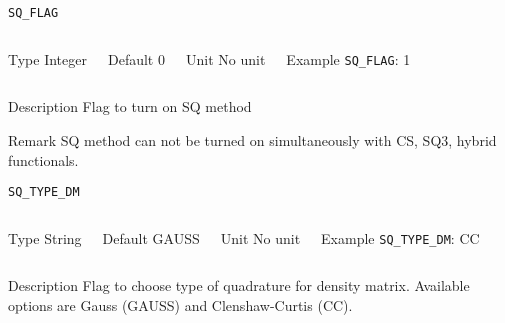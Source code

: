 \begin{frame}[allowframebreaks]{\texttt{SQ\_FLAG}} \label{SQ_FLAG}
\vspace*{-12pt}
\begin{columns}
\begin{block}{Type}
Integer
\end{block}

\begin{block}{Default}
0
\end{block}

\begin{block}{Unit}
No unit
\end{block}

\begin{block}{Example}
\texttt{SQ\_FLAG}: 1
\end{block}
\end{columns}

\begin{block}{Description}
Flag to turn on SQ method 
\end{block}

\begin{block}{Remark}
SQ method can not be turned on simultaneously with CS, SQ3, hybrid functionals. 
\end{block}

\end{frame}


\begin{frame}[allowframebreaks]{\texttt{SQ\_TYPE\_DM}} \label{SQ_TYPE_DM}
\vspace*{-12pt}
\begin{columns}
\begin{block}{Type}
String
\end{block}

\begin{block}{Default}
GAUSS
\end{block}

\begin{block}{Unit}
No unit
\end{block}

\begin{block}{Example}
\texttt{SQ\_TYPE\_DM}: CC
\end{block}
\end{columns}

\begin{block}{Description}
Flag to choose type of quadrature for density matrix. Available options are Gauss (GAUSS) and Clenshaw-Curtis (CC). 
\end{block}

\end{frame}


